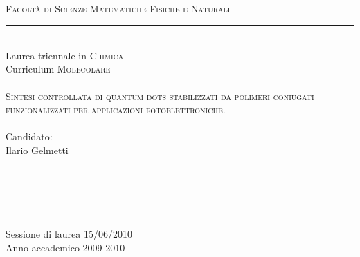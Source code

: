 \documentclass[a4paper, italian, oneside
, 12pt
]{book}
\begin{document}
\pagestyle{empty}
\cleardoublepage

\begin{titlepage}\begin{center}
	\\%
   	\large{\textsc{Facoltà di Scienze Matematiche Fisiche e Naturali}}\\
		\rule{5cm}{1pt}\\
	{\small{Laurea triennale in \textsc{Chimica}}}\\
	{\small{Curriculum \textsc{Molecolare}}}\\
		\makebox[\textwidth]{\rule{0pt}{.06\textheight}}\\
	\LARGE{\textsc{Sintesi controllata di quantum dots stabilizzati da polimeri coniugati funzionalizzati per applicazioni fotoelettroniche.}}\\
		\makebox[\textwidth]{\rule{0pt}{.03\textheight}}\\
	\footnotesize{Candidato:}\\
	\large{Ilario Gelmetti}\\
		\makebox[.2\textwidth]{\rule{0pt}{.02\textheight}}\\
\end{center}
\begin{small}
\bigskip
\makebox[\textwidth]{\rule{0pt}{.01\textheight}}\\
	\begin{center}
	\rule{3cm}{1pt}\\
	Sessione di laurea 15/06/2010\\
	Anno accademico 2009-2010\\
	\end{center}
\end{small}
\end{titlepage}
\end{document}
